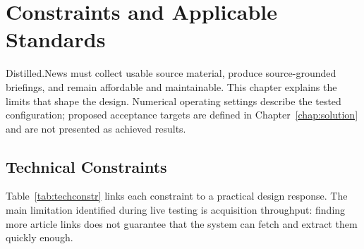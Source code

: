 \chapter{Constraints and Applicable Standards}
\label{chap:constraints}

Distilled.News must collect usable source material, produce source-grounded briefings, and remain affordable and maintainable. This chapter explains the limits that shape the design. Numerical operating settings describe the tested configuration; proposed acceptance targets are defined in Chapter~\ref{chap:solution} and are not presented as achieved results.

\section{Technical Constraints}

Table~\ref{tab:techconstr} links each constraint to a practical design response. The main limitation identified during live testing is acquisition throughput: finding more article links does not guarantee that the system can fetch and extract them quickly enough.

